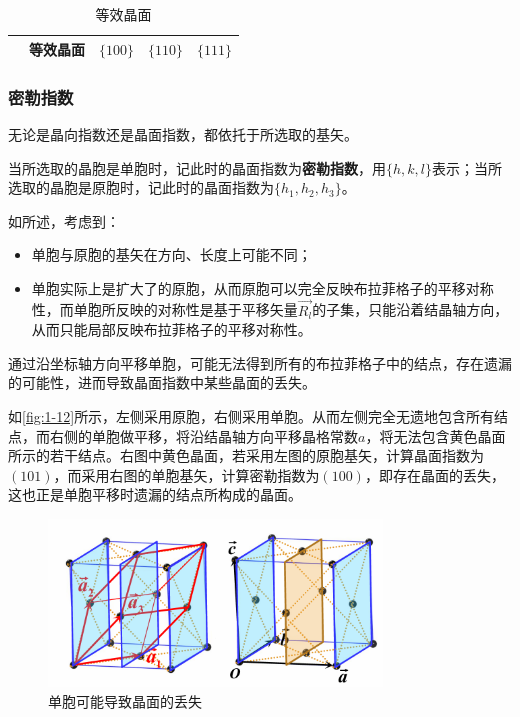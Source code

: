 \begin{table}[!htbp]
{\begin{tabular}{ccccc}
                                           & 等效晶面 & $\{100\}$ & $\{110\}$ & $\{111\}$ \\
            \bottomrule
        \end{tabular}
        }
        \caption{等效晶面}
        \label{tab:1-9}
    \end{table}

\subsubsection{密勒指数}
    无论是晶向指数还是晶面指数，都依托于所选取的基矢。
    
    当所选取的晶胞是单胞时，记此时的晶面指数为\textbf{密勒指数}\label{密勒指数}，用$\{h, k, l\}$表示；当所选取的晶胞是原胞时，记此时的晶面指数为$\{h_1, h_2, h_3\}$。

    如所述，考虑到：
    \begin{itemize}[itemsep=0pt,parsep=0pt]
        \item 单胞与原胞的基矢在方向、长度上可能不同；
        \item 单胞实际上是扩大了的原胞，从而原胞可以完全反映布拉菲格子的平移对称性，而单胞所反映的对称性是基于平移矢量$\vec{R_l}$的子集，只能沿着结晶轴方向，从而只能局部反映布拉菲格子的平移对称性。
    \end{itemize}
    通过沿坐标轴方向平移单胞，可能无法得到所有的布拉菲格子中的结点，存在遗漏的可能性，进而导致晶面指数中某些晶面的丢失。

    如\autoref{fig:1-12}所示，左侧采用原胞，右侧采用单胞。从而左侧完全无遗地包含所有结点，而右侧的单胞做平移，将沿结晶轴方向平移晶格常数$a$，将无法包含黄色晶面所示的若干结点。右图中黄色晶面，若采用左图的原胞基矢，计算晶面指数为$(101)$，而采用右图的单胞基矢，计算密勒指数为$(100)$，即存在晶面的丢失，这也正是单胞平移时遗漏的结点所构成的晶面。

    \begin{figure}[!htbp]
        \centering    
        \includegraphics[height=12em, keepaspectratio=true]{pic/1-42}
        \caption{单胞可能导致晶面的丢失}
        \label{fig:1-12}
    \end{figure}


